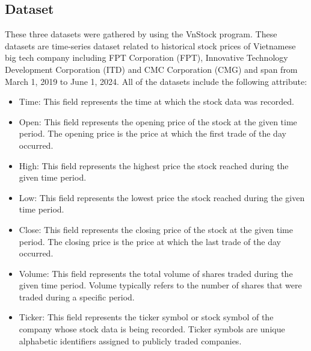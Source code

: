\documentclass{ieeeojies}
\begin{document}
\subsection{Dataset}
These three datasets were gathered by using the VnStock program. These datasets are time-series dataset related to historical stock prices of Vietnamese big tech company including FPT Corporation (FPT), Innovative Technology Development Corporation (ITD) and CMC Corporation (CMG) and span from March 1, 2019 to June 1, 2024. All of the datasets include the following attribute:
\begin{itemize}
    \item Time: This field represents the time at which the stock data was recorded.
    \item Open: This field represents the opening price of the stock at the given time period. The opening price is the price at which the first trade of the day occurred.
    \item High: This field represents the highest price the stock reached during the given time period.
    \item Low: This field represents the lowest price the stock reached during the given time period.
    \item Close: This field represents the closing price of the stock at the given time period. The closing price is the price at which the last trade of the day occurred.
    \item Volume: This field represents the total volume of shares traded during the given time period. Volume typically refers to the number of shares that were traded during a specific period.
    \item Ticker: This field represents the ticker symbol or stock symbol of the company whose stock data is being recorded. Ticker symbols are unique alphabetic identifiers assigned to publicly traded companies.
\end{itemize}
\end{document}
